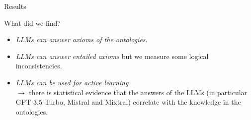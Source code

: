 \documentclass[presentation]{beamer}\mode<presentation>{\usetheme{blackAMSBolognaFC}}
\begin{document}
\begin{frame}[c]{Results}


    What did we find?
    \vfill
    \begin{itemize}
        \item \emph{LLMs can answer axioms of the ontologies}.
        \vfill
        \item \emph{LLMs can answer entailed axioms} but we measure some logical inconsistencies.
        \vfill
        \item \emph{LLMs can be used for active learning}
        \\
        $\rightarrow$ there is statistical evidence that the answers of the LLMs (in particular GPT 3.5 Turbo, Mistral and Mixtral) correlate with the knowledge in the ontologies.
    \end{itemize}

\end{frame}

\section*{}
\frame{\titlepage}

\section*{\bibname}
\end{document}
